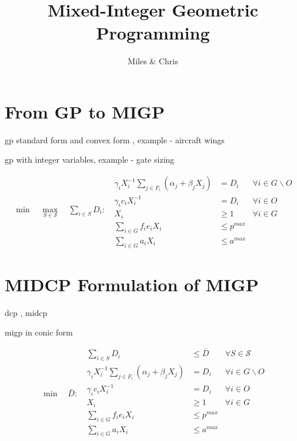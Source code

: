 \documentclass[]{article}
\title{Mixed-Integer Geometric Programming}
\author{Miles \& Chris}
\date{}
\begin{document}
\maketitle


\section{From GP to MIGP}

gp standard form and convex form \cite{boyd07}, example - aircraft wings \cite{hoburg14a}

gp with integer variables, example - gate sizing \cite{boyd07}

\begin{subequations}
\begin{align}
\min \quad \max_{S \in \mathcal{S}} \quad
\sum_{i \in S} D_i :
\end{align}
\
\begin{align}
\gamma_i X_i^{-1} \sum_{j \in F_i} \left( \alpha_j + \beta_j X_j \right) 
& = D_i
& \forall i \in G \backslash O
\\
\gamma_i c_i X_i^{-1} 
& = D_i 
& \forall i \in O
\\
X_i
& \geq 1
& \forall i \in G
\\
\sum_{i \in G} f_i e_i X_i 
& \leq p^{max}
\\
\sum_{i \in G} a_i X_i 
& \leq a^{max}
\end{align}
\end{subequations}




\section{MIDCP Formulation of MIGP}

dcp \cite{boyd06}, midcp \cite{lubin15}

migp in conic form

\begin{subequations}
\begin{align}
\min \quad \bar{D} :
\end{align}
\
\begin{align}
\sum_{i \in S} D_i
& \leq \bar{D}
& \forall S \in \mathcal{S}
\\
\gamma_i X_i^{-1} \sum_{j \in F_i} \left( \alpha_j + \beta_j X_j \right) 
& = D_i
& \forall i \in G \backslash O
\\
\gamma_i c_i X_i^{-1} 
& = D_i 
& \forall i \in O
\\
X_i
& \geq 1
& \forall i \in G
\\
\sum_{i \in G} f_i e_i X_i 
& \leq p^{max}
\\
\sum_{i \in G} a_i X_i 
& \leq a^{max}
\end{align}
\end{subequations}
\end{document}
